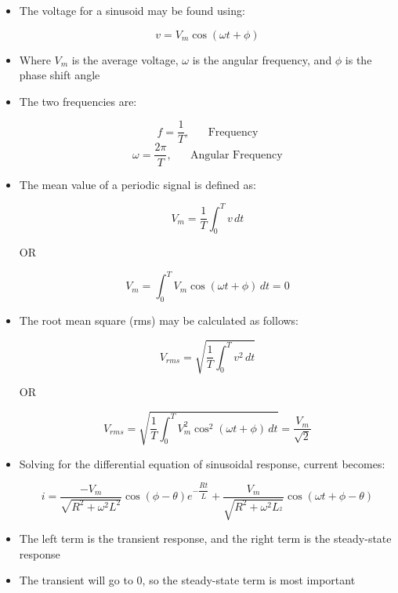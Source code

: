 \begin{itemize}

  \item The voltage for a sinusoid may be found using:

    $$\boxed{v=V_m\cos(\omega t+\phi)}$$

  \item Where $V_m$ is the average voltage, $\omega$ is the angular frequency, and $\phi$ is the phase shift angle

  \item The two frequencies are:

    $$f=\frac{1}{T},\,\,\,\,\,\,\,\,\,\,\text{Frequency}$$
    $$\omega=\frac{2\pi}{T},\,\,\,\,\,\,\,\,\,\,\text{Angular Frequency}$$

  \item The mean value of a periodic signal is defined as:

    $$V_m=\frac{1}{T}\int_0^T v\,dt$$

    \begin{center}
      \textsc{OR}
    \end{center}

    \vspace{-15pt}

    $$\boxed{V_m=\int_0^TV_m\cos(\omega t+\phi)\,dt=0}$$

  \item The root mean square (rms) may be calculated as follows:

    $$V_{rms}=\sqrt{\frac{1}{T}\int_0^Tv^2\,dt}$$

    \begin{center}
      \textsc{OR}
    \end{center}

    \vspace{-15pt}

    $$\boxed{V_{rms}=\sqrt{\frac{1}{T}\int_0^T V_m^2\cos^2(\omega t+\phi)\,dt}=\frac{V_m}{\sqrt{2}}}$$

  \item Solving for the differential equation of sinusoidal response, current becomes:

    $$i=\dfrac{-V_m}{\sqrt{R^2+\omega^2L^2}}\cos(\phi-\theta)e^{-\dfrac{Rt}{L}}+\dfrac{V_m}{\sqrt{R^2+\omega^2L_^2}}\cos(\omega t+\phi-\theta)$$

  \item The left term is the transient response, and the right term is the steady-state response

  \item The transient will go to 0, so the steady-state term is most important


\end{itemize}
